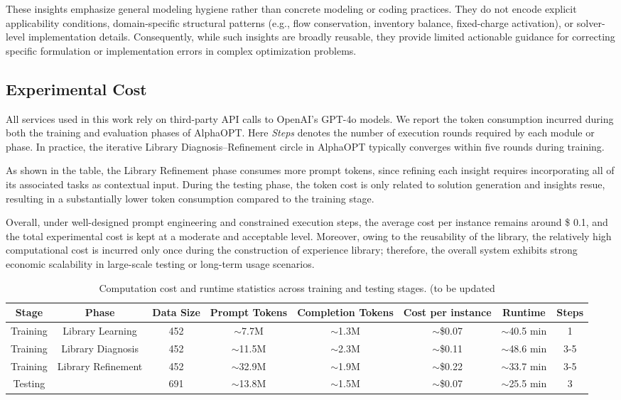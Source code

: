 \documentclass[sigconf, nonacm]{acmart}
\begin{document}
These insights emphasize general modeling hygiene rather than concrete modeling or coding practices. They do not encode explicit applicability conditions, domain-specific structural patterns (e.g., flow conservation, inventory balance, fixed-charge activation), or solver-level implementation details. Consequently, while such insights are broadly reusable, they provide limited actionable guidance for correcting specific formulation or implementation errors in complex optimization problems. 


\subsection{Experimental Cost}

All services used in this work rely on third-party API calls to OpenAI’s GPT-4o models. We report the token consumption incurred during both the training and evaluation phases of AlphaOPT. Here \emph{Steps} denotes the number of execution rounds required by each module or phase. In practice, the iterative Library Diagnosis–Refinement circle in AlphaOPT typically converges within five rounds during training.

As shown in the table, the Library Refinement phase consumes more prompt tokens, since refining each insight requires incorporating all of its associated tasks as contextual input. During the testing phase, the token cost is only related to solution generation and insights resue, resulting in a substantially lower token consumption compared to the training stage.

Overall, under well-designed prompt engineering and constrained execution steps, the average cost per instance remains around \$ 0.1, and the total experimental cost is kept at a moderate and acceptable level. Moreover, owing to the reusability of the library, the relatively high computational cost is incurred only once during the construction of experience library; therefore, the overall system exhibits strong economic scalability in large-scale testing or long-term usage scenarios.

\begin{table}[t]
\centering
\caption{Computation cost and runtime statistics across training and testing stages. (to be updated}
\label{tab:cost_runtime}
\begin{tabular}{cccccccc}
\hline
Stage & Phase & Data Size & Prompt Tokens & Completion Tokens & Cost per instance & Runtime & Steps \\
\hline
Training & Library Learning & 452 & $\sim$7.7M & $\sim$1.3M & $\sim$\$0.07 & $\sim$40.5 min & 1 \\
Training & Library Diagnosis       & 452 & $\sim$11.5M & $\sim$2.3M & $\sim$\$0.11  & $\sim$48.6 min  & 3-5 \\
Training & Library Refinement      & 452 & $\sim$32.9M & $\sim$1.9M & $\sim$\$0.22 & $\sim$33.7 min  & 3-5 \\
Testing  &  & 691 & $\sim$13.8M & $\sim$1.5M & $\sim$\$0.07  & $\sim$25.5 min  & 3 \\
\hline
\end{tabular}
\end{table}
\end{document}

